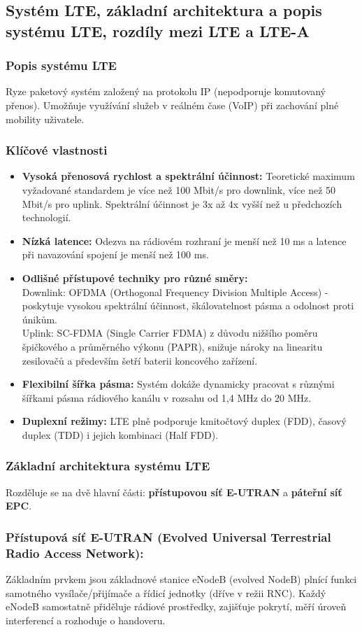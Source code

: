 	\subsection{Systém LTE, základní architektura a popis systému LTE, rozdíly mezi LTE a LTE-A}
		\subsubsection{Popis systému LTE}
		Ryze paketový systém založený na protokolu IP (nepodporuje komutovaný přenos). Umožňuje využívání služeb v reálném čase (VoIP) při zachování plné mobility uživatele.
		\subsubsection*{Klíčové vlastnosti}
			\begin{itemize}
				\item \textbf{Vysoká přenosová rychlost a spektrální účinnost:} Teoretické maximum vyžadované standardem je více než 100 Mbit/s pro downlink, více než 50 Mbit/s pro uplink. Spektrální účinnost je 3x až 4x vyšší než u předchozích technologií.
				\item \textbf{Nízká latence:} Odezva na rádiovém rozhraní je menší než 10 ms a latence při navazování spojení je menší než 100 ms.
				\item \textbf{Odlišné přístupové techniky pro různé směry:}\\
				Downlink: OFDMA (Orthogonal Frequency Division Multiple Access) - poskytuje vysokou spektrální účinnost, škálovatelnost pásma a odolnost proti únikům.\\
				Uplink: SC-FDMA (Single Carrier FDMA) z důvodu nižšího poměru špičkového a průměrného výkonu (PAPR), snižuje nároky na linearitu zesilovačů a především šetří baterii koncového zařízení.
				\item \textbf{Flexibilní šířka pásma:} Systém dokáže dynamicky pracovat s různými šířkami pásma rádiového kanálu v rozsahu od 1,4 MHz do 20 MHz.
				\item \textbf{Duplexní režimy:} LTE plně podporuje kmitočtový duplex (FDD), časový duplex (TDD) i jejich kombinaci (Half FDD).
			\end{itemize}
		\subsubsection{Základní architektura systému LTE}
		Rozděluje se na dvě hlavní části: \textbf{přístupovou síť E-UTRAN} a \textbf{páteřní síť EPC}. 
		\subsubsection*{Přístupová síť E-UTRAN (Evolved Universal Terrestrial Radio Access Network):}
		Základním prvkem jsou základnové stanice eNodeB (evolved NodeB) plnící funkci samotného vysílače/přijímače a řídicí jednotky (dříve v režii RNC). Každý eNodeB samostatně přiděluje rádiové prostředky, zajišťuje pokrytí, měří úroveň interferencí a rozhoduje o handoveru.
